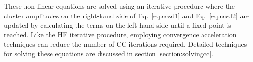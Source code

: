 \documentclass[thesis.tex]{subfiles}
\begin{document}
These non-linear equations are solved using an iterative procedure where the cluster amplitudes on the right-hand side of Eq.\ \eqref{eq:ccsd1} and Eq.\ \eqref{eq:ccsd2} are updated by calculating the terms on the left-hand side until a fixed point is reached.  Like the HF iterative procedure, employing convergence acceleration techniques can reduce the number of CC iterations required.  Detailed techniques for solving these equations are discussed in section \ref{section:solvingcc}.


\end{document}
